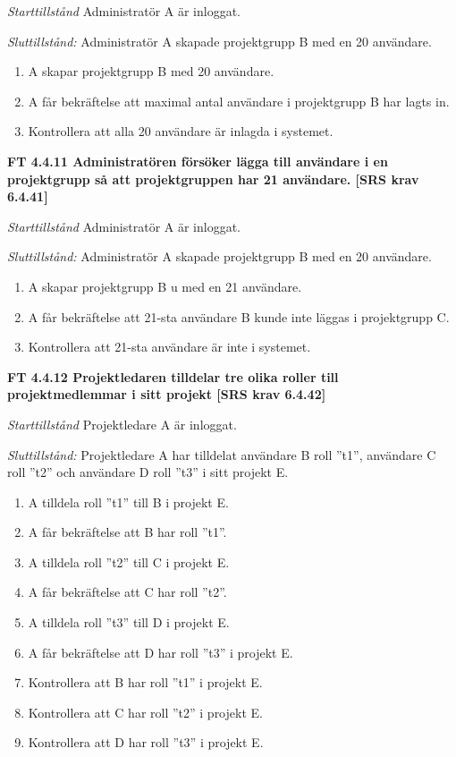 \documentclass[a4paper]{article}
\begin{document}
\emph{Starttillstånd} Administratör A är inloggat.

\emph{Sluttillstånd:} Administratör A  skapade  projektgrupp B med en 20  användare.

\begin{enumerate}
\item A skapar projektgrupp B med 20 användare.
\item A får bekräftelse att maximal antal användare i projektgrupp B  har lagts in.
\item Kontrollera att alla 20 användare är inlagda i systemet.
\end{enumerate}

\textbf{FT 4.4.11 Administratören försöker lägga till användare i en projektgrupp så att projektgruppen har 21 användare. [SRS krav 6.4.41]}

\emph{Starttillstånd} Administratör A är inloggat.

\emph{Sluttillstånd:} Administratör A  skapade  projektgrupp B med en 20  användare.

\begin{enumerate}
\item A skapar projektgrupp B u med en 21  användare.
\item A får bekräftelse att 21-sta användare B kunde inte läggas i projektgrupp C.
\item Kontrollera att 21-sta användare är inte i systemet.
\end{enumerate}

\textbf{FT 4.4.12 Projektledaren tilldelar tre olika roller till projektmedlemmar i sitt projekt [SRS krav 6.4.42]}

\emph{Starttillstånd} Projektledare A är inloggat.

\emph{Sluttillstånd:} Projektledare A  har tilldelat användare B roll ”t1”, användare C roll ”t2” och användare D roll ”t3” i sitt projekt E.

\begin{enumerate}
\item A tilldela roll ”t1” till B i projekt E.
\item A får bekräftelse att B har roll ”t1”.
\item A tilldela roll ”t2” till C i projekt E.
\item A får bekräftelse att C har roll ”t2”.
\item A tilldela roll ”t3” till D i projekt E.
\item A får bekräftelse att D har roll ”t3” i projekt E.
\item Kontrollera att B har roll ”t1” i projekt E.
\item Kontrollera att C har roll ”t2” i projekt E.
\item Kontrollera att D har roll ”t3” i projekt E.
\end{enumerate}
\end{document}
